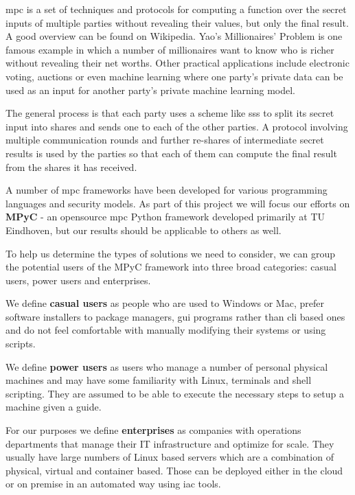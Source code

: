 \gls{mpc} is a set of techniques and protocols for computing a function
over the secret inputs of multiple parties without revealing their
values, but only the final result. A good overview can be found on
Wikipedia\autocite{wikiMPC}. Yao's Millionaires'
Problem\autocite{yaoProtocolsSecureComputations1982} is one famous
example in which a number of millionaires want to know who is richer
without revealing their net worths. Other practical
applications\autocite{laudApplicationsSecureMultiparty2015} include
electronic voting, auctions or even machine
learning\autocite{knottCrypTenSecureMultiParty2022} where one party's
private data can be used as an input for another party's private machine
learning model.

The general process is that each party uses a scheme like \gls{sss}
\autocite{shamirHowShareSecret1979} to split its secret input into
shares and sends one to each of the other parties. A protocol involving
multiple communication rounds and further re-shares of intermediate
secret results is used by the parties so that each of them can compute
the final result from the shares it has received.

A number of \gls{mpc} frameworks have been developed for various
programming languages and security models. As part of this project we
will focus our efforts on \textbf{MPyC}\autocite{mpycHome,mpycSource} -
an opensource \gls{mpc} Python framework developed primarily at TU
Eindhoven, but our results should be applicable to others as well.

To help us determine the types of solutions we need to consider, we can
group the potential users of the MPyC framework into three broad
categories: casual users, power users and enterprises.

We define \textbf{casual users} as people who are used to Windows or
Mac, prefer software installers to package managers, \gls{gui} programs
rather than \gls{cli} based ones and do not feel comfortable with
manually modifying their systems or using scripts.

We define \textbf{power users} as users who manage a number of personal
physical machines and may have some familiarity with Linux, terminals
and shell scripting. They are assumed to be able to execute the
necessary steps to setup a machine given a guide.

For our purposes we define \textbf{enterprises} as companies with
operations departments that manage their IT infrastructure and optimize
for scale. They usually have large numbers of Linux based servers which
are a combination of physical, virtual and container based. Those can be
deployed either in the cloud or on premise in an automated way using
\gls{iac} tools.


